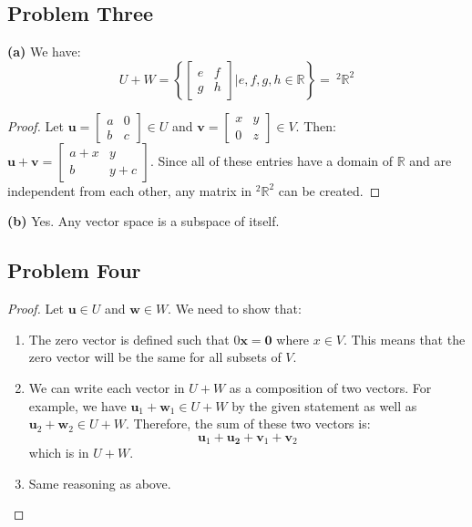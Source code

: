 \documentclass{article}
\begin{document}
\subsection*{Problem Three}
\noindent \textbf{(a)} We have:
\begin{equation}
    U + W = \left\{\begin{bmatrix}
        e & f \\ g & h
    \end{bmatrix} \Bigg| e,f,g,h \in \mathbb{R}\right\} = \ ^2\mathbb{R}^2
\end{equation}
\begin{proof}
    Let $\bm{u}=\begin{bmatrix}
        a&0\\b&c
    \end{bmatrix} \in U$ and $\bm{v} = \begin{bmatrix}
        x & y \\ 0 & z
    \end{bmatrix} \in V$. Then: $\bm{u}+\bm{v} = \begin{bmatrix}
        a+x & y \\ b & y+c
    \end{bmatrix}$. Since all of these entries have a domain of $\mathbb{R}$ and are independent from each other, any matrix in $^2\mathbb{R}^2$ can be created. 
\end{proof}
\vspace{2mm}

\noindent \textbf{(b)} Yes. Any vector space is a subspace of itself.
\subsection*{Problem Four}
\begin{proof}
Let $\bm{u} \in U$ and $\bm{w} \in W$. We need to show that:
\begin{enumerate}[label=(S\Roman*)]
    \item The zero vector is defined such that $0\bm{x} = \bm{0}$ where $x \in V$. This means that the zero vector will be the same for all subsets of $V$.
    \item We can write each vector in $U+W$ as a composition of two vectors. For example, we have $\bm{u}_1+\bm{w}_1 \in U + W$ by the given statement as well as $\bm{u}_2+\bm{w}_2 \in U + W$. Therefore, the sum of these two vectors is:
    \begin{equation}
        \bm{u}_1+\bm{u_2}+\bm{v}_1+\bm{v}_2
    \end{equation}
    which is in $U+W$.
    \item Same reasoning as above.
\end{enumerate}
\end{proof}
\end{document}
